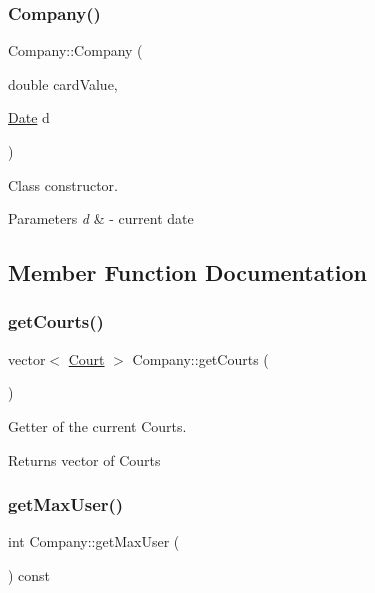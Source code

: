 \subsubsection{\texorpdfstring{Company()}{Company()}}
{\footnotesize\ttfamily Company\+::\+Company (\begin{DoxyParamCaption}\item[{double}]{card\+Value,  }\item[{\mbox{\hyperlink{class_date}{Date}}}]{d }\end{DoxyParamCaption})}



Class constructor. 


\begin{DoxyParams}{Parameters}
{\em d} & -\/ current date \\
\hline
\end{DoxyParams}


\subsection{Member Function Documentation}
\mbox{\label{class_company_afa0ab125a0ba718fe2c13802fe1703be}} 
\subsubsection{\texorpdfstring{get\+Courts()}{getCourts()}}
{\footnotesize\ttfamily vector$<$ \mbox{\hyperlink{class_court}{Court}} $>$ Company\+::get\+Courts (\begin{DoxyParamCaption}{ }\end{DoxyParamCaption})}



Getter of the current Courts. 

\begin{DoxyReturn}{Returns}
vector of Courts 
\end{DoxyReturn}
\mbox{\label{class_company_a837fd39a8f03c20a3ceb8617410956b7}} 
\subsubsection{\texorpdfstring{get\+Max\+User()}{getMaxUser()}}
{\footnotesize\ttfamily int Company\+::get\+Max\+User (\begin{DoxyParamCaption}{ }\end{DoxyParamCaption}) const}




